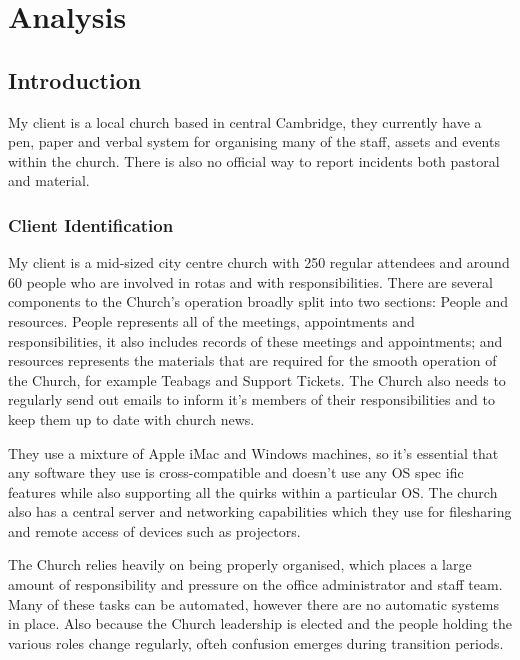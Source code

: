 \chapter{Analysis}

\section{Introduction}
	My client is a local church based in central Cambridge, they currently have a pen, paper and verbal system for organising many of the staff,
	assets and events within the church. There is also no official way to report incidents both pastoral and material.

\subsection{Client Identification}
	My client is a mid-sized city centre church with 250 regular attendees and around 60 people who are involved in rotas and with responsibilities.
	There are several components to the Church's operation broadly split into two sections: People and resources. People represents all of the meetings, appointments and responsibilities, it also includes records of these meetings and appointments; and resources represents the materials that are required for the smooth operation of the Church, for example Teabags and Support Tickets. The Church also needs to regularly send out emails to inform it's members of their responsibilities and to keep them up to date with church news.

	They use a mixture of Apple iMac and Windows machines, so it's essential that any software they use is cross-compatible and doesn't use any OS spec
	ific features while also supporting all the quirks within a particular OS. The church also has a central server and networking capabilities which they use for filesharing and remote access of devices such as projectors.

	The Church relies heavily on being properly organised, which places a large amount of responsibility and pressure on the office administrator and
	staff team. Many of these tasks can be automated, however there are no automatic systems in place. Also because the Church leadership is elected and the people holding the various roles change regularly, ofteh confusion emerges during transition periods.



